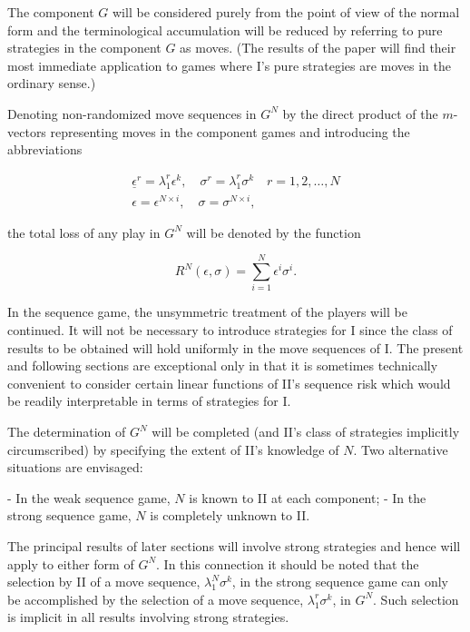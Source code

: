 \documentclass[11pt]{article}
\numberwithin{equation}{section}
\theoremstyle{boldStyle}
\begin{document}
The component \( G \) will be considered purely from the point of view of the normal form and the terminological accumulation 
will be reduced by referring to pure strategies in the component \( G \) as moves. (The results of the paper will find their most 
immediate application to games where I's pure strategies are moves in the ordinary sense.)

Denoting non-randomized move sequences in \( G^N \) by the direct product of the \( m \)-vectors representing moves in the component 
games and introducing the abbreviations

\begin{equation}
    \begin{aligned}
        \underline{\epsilon}^r  = \lambda_1^r \epsilon^k, \quad \sigma^r = \lambda_1^r \sigma^k \quad r = 1, 2, \ldots, N \\
        \epsilon = \epsilon^{N \times i}, \quad \sigma = \sigma^{N \times i},
    \end{aligned}
\end{equation}

the total loss of any play in \( G^N \) will be denoted by the function

\[
R^N(\epsilon, \sigma) = \sum_{i=1}^{N} \epsilon^i \sigma^i.
\]

In the sequence game, the unsymmetric treatment of the players will be continued. It will not be necessary to introduce strategies for I since the class of results to be obtained will hold uniformly in the move sequences of I. The present and following sections are exceptional only in that it is sometimes technically convenient to consider certain linear functions of II's sequence risk which would be readily interpretable in terms of strategies for I.

The determination of \( G^N \) will be completed (and II's class of strategies implicitly circumscribed) by specifying the extent of II's knowledge of \( N \). Two alternative situations are envisaged:

- In the weak sequence game, \( N \) is known to II at each component;
- In the strong sequence game, \( N \) is completely unknown to II.

The principal results of later sections will involve strong strategies and hence will apply to either form of \( G^N \). 
In this connection it should be noted that the selection by II of a move sequence, \( \lambda_1^N \sigma^k \), in the strong sequence game can only be accomplished by the selection of a move sequence, \( \lambda_1^r \sigma^k \), in \( G^N \). Such selection is implicit in all results involving strong strategies.
\end{document}
